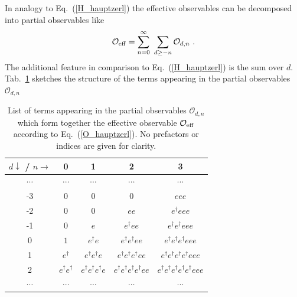 In analogy to Eq.~(\ref{H_hauptzerl}) the effective observables can be 
decomposed into partial observables like
\begin{equation}
  \label{O_hauptzerl}
  {\mathcal O}_{\rm eff}=\sum_{n=0}^{\infty}\ \sum_{d\ge -n} {\mathcal
  O}_{d,n}\ .
\end{equation}
The additional feature in comparison to Eq.~(\ref{H_hauptzerl}) is the
sum over $d$. Tab.~\ref{O_zersplittert} sketches the structure of
the terms appearing in the partial observables ${\mathcal O}_{d,n}$
\begin{table}[ht]
\begin{tabular}{|c||c|c|c|c|}
\hline
$d\downarrow$ / $n\rightarrow$ & 0 & 1 & 2 & 3 \\
\hline\hline
$\cdots$ & $\cdots$ & $\cdots$ & $\cdots$ & $\cdots$ \\
\hline
-3 &$0$&$0$&$0$&$eee$ \\
\hline
-2 &$0$&$0$&$ee$&$e^{\dagger}eee$ \\
\hline
-1 &$0$&$e$&$e^{\dagger}ee$&$e^{\dagger}e^{\dagger}eee$ \\
\hline
0 &$1$&$e^{\dagger}e$&$e^{\dagger}e^{\dagger}ee$&$e^{\dagger}e^{\dagger}e^{\dagger}eee$ \\
\hline
1 &$e^{\dagger}$&$e^{\dagger}e^{\dagger}e$&$e^{\dagger}e^{\dagger}e^{\dagger}ee$&$e^{\dagger}e^{\dagger}e^{\dagger}e^{\dagger}eee$ \\
\hline
2 &$e^{\dagger}e^{\dagger}$&$e^{\dagger}e^{\dagger}e^{\dagger}e$&$e^{\dagger}e^{\dagger}e^{\dagger}e^{\dagger}ee$&$e^{\dagger}e^{\dagger}e^{\dagger}e^{\dagger}e^{\dagger}eee$ \\
\hline
$\cdots$ & $\cdots$ & $\cdots$ & $\cdots$ & $\cdots$ \\
\hline
\end{tabular}
\caption{\label{O_zersplittert} List of terms appearing in the
  partial observables ${\mathcal O}_{d,n}$ which form together the
  effective observable ${\mathcal O}_{\rm eff}$ according to
  Eq.~(\ref{O_hauptzerl}). No prefactors or indices are given for clarity.}  
\end{table}

